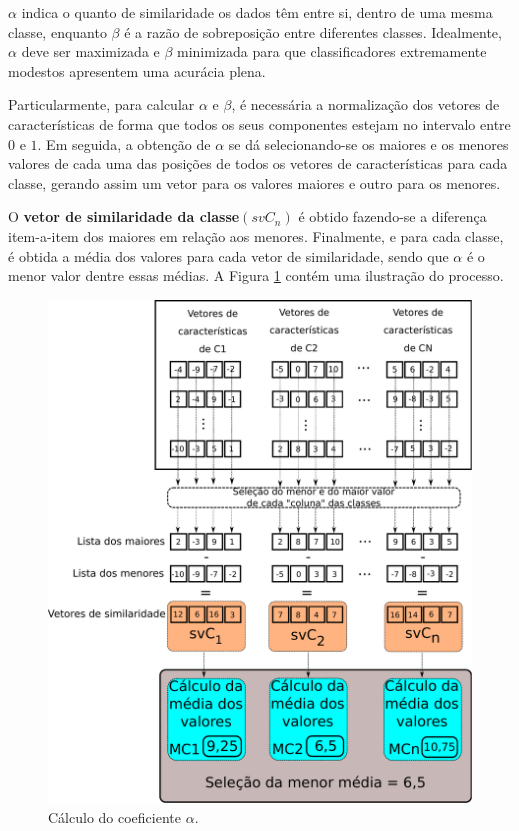 				\par $\alpha$ indica o quanto de similaridade os dados têm entre si, dentro de uma mesma classe, enquanto $\beta$ é a razão de sobreposição entre diferentes classes. Idealmente, $\alpha$ deve ser maximizada e $\beta$ minimizada para que classificadores extremamente modestos apresentem uma acurácia plena.
				
				\par Particularmente, para calcular $\alpha$ e $\beta$, é necessária a normalização dos vetores de características de forma que todos os seus componentes estejam no intervalo entre $0$ e $1$. Em seguida, a obtenção de $\alpha$ se dá selecionando-se os maiores e os menores valores de cada uma das posições de todos os vetores de características para cada classe, gerando assim um vetor para os valores maiores e outro para os menores.
				
				\par O \textbf{vetor de similaridade da classe}$(svC_n)$ é obtido fazendo-se a diferença item-a-item dos maiores em relação aos menores. Finalmente, e para cada classe, é obtida a média dos valores para cada vetor de similaridade, sendo que $\alpha$ é o menor valor dentre essas médias. A Figura \ref{fig:calculoalpha} contém uma ilustração do processo.
				
				\begin{figure}
					\centering
		       	\includegraphics[width=0.77\linewidth]{images/calculoAlpha.pdf}
					\caption{Cálculo do coeficiente $\alpha$.}
					\label{fig:calculoalpha}
				\end{figure}
				

